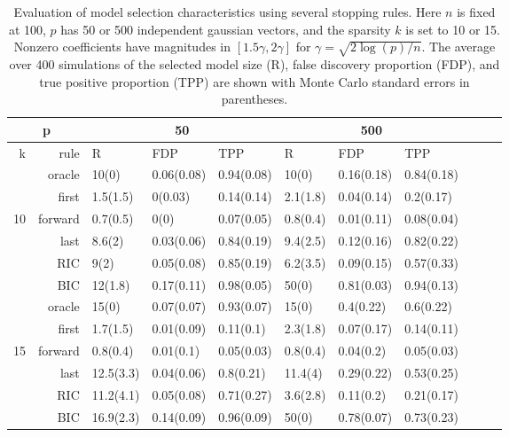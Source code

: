 
\begin{table}[ht]
\centering
\begin{tabular}{|r|r|lll|lll|lll|}
 \hline
   \multicolumn{2}{|c|}{p} & \multicolumn{3}{c|}{50}  & \multicolumn{3}{c|}{500} \\ 
  \hline \hline
    k & rule  &  R        & FDP        &  TPP          &   R      & FDP        & TPP \\ 
  \hline 
   & oracle  & 10(0)     & 0.06(0.08) & 0.94(0.08)  & 10(0) & 0.16(0.18) & 0.84(0.18) \\ 
   & first   & 1.5(1.5)  & 0(0.03)    & 0.14(0.14)  & 2.1(1.8) & 0.04(0.14) & 0.2(0.17) \\
10 & forward & 0.7(0.5)  & 0(0)       & 0.07(0.05)  & 0.8(0.4) & 0.01(0.11) & 0.08(0.04) \\
   & last    & 8.6(2)    & 0.03(0.06) & 0.84(0.19)  & 9.4(2.5) & 0.12(0.16) & 0.82(0.22) \\
   & RIC     & 9(2)      & 0.05(0.08) & 0.85(0.19)  & 6.2(3.5) & 0.09(0.15) & 0.57(0.33) \\
   & BIC     & 12(1.8)   & 0.17(0.11) & 0.98(0.05)  & 50(0) & 0.81(0.03) & 0.94(0.13) \\ 
  \hline
   & oracle  & 15(0)     & 0.07(0.07) & 0.93(0.07)  & 15(0) & 0.4(0.22) & 0.6(0.22) \\   
   & first   & 1.7(1.5)  & 0.01(0.09) & 0.11(0.1)   & 2.3(1.8) & 0.07(0.17) & 0.14(0.11) \\
15 & forward & 0.8(0.4)  & 0.01(0.1)  & 0.05(0.03)  & 0.8(0.4) & 0.04(0.2) & 0.05(0.03) \\
   & last    & 12.5(3.3) & 0.04(0.06) & 0.8(0.21)   & 11.4(4) & 0.29(0.22) & 0.53(0.25) \\
   & RIC     & 11.2(4.1) & 0.05(0.08) & 0.71(0.27)  & 3.6(2.8) & 0.11(0.2) & 0.21(0.17) \\
   & BIC     & 16.9(2.3) & 0.14(0.09) & 0.96(0.09)  & 50(0) & 0.78(0.07) & 0.73(0.23) \\ 

  \hline
\end{tabular}
\caption{Evaluation of model selection characteristics using several stopping rules.
  Here $n$ is fixed at 100, $p$ has 50 or 500 independent gaussian vectors,
  and the sparsity $k$ is set to 10 or 15.
  Nonzero coefficients have magnitudes in $[1.5\gamma, 2\gamma]$ for
  $\gamma = \sqrt{2\log (p)/n}$. The average over 400 simulations of the selected model
  size  (R), false discovery proportion  (FDP), and true positive proportion  (TPP)
  are shown with Monte Carlo standard errors in parentheses.}
\end{table}

